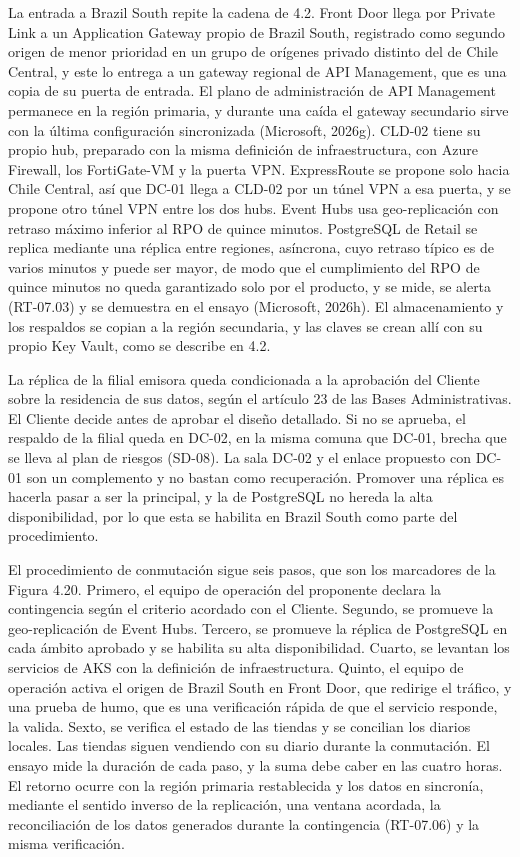 \documentclass[11pt]{article}
\begin{document}
La entrada a Brazil South repite la cadena de 4.2. Front Door llega por Private Link a un Application Gateway propio de Brazil South, registrado como segundo origen de menor prioridad en un grupo de orígenes privado distinto del de Chile Central, y este lo entrega a un gateway regional de API Management, que es una copia de su puerta de entrada. El plano de administración de API Management permanece en la región primaria, y durante una caída el gateway secundario sirve con la última configuración sincronizada (Microsoft, 2026g). CLD-02 tiene su propio hub, preparado con la misma definición de infraestructura, con Azure Firewall, los FortiGate-VM y la puerta VPN. ExpressRoute se propone solo hacia Chile Central, así que DC-01 llega a CLD-02 por un túnel VPN a esa puerta, y se propone otro túnel VPN entre los dos hubs. Event Hubs usa geo-replicación con retraso máximo inferior al RPO de quince minutos. PostgreSQL de Retail se replica mediante una réplica entre regiones, asíncrona, cuyo retraso típico es de varios minutos y puede ser mayor, de modo que el cumplimiento del RPO de quince minutos no queda garantizado solo por el producto, y se mide, se alerta (RT-07.03) y se demuestra en el ensayo (Microsoft, 2026h). El almacenamiento y los respaldos se copian a la región secundaria, y las claves se crean allí con su propio Key Vault, como se describe en 4.2.

La réplica de la filial emisora queda condicionada a la aprobación del Cliente sobre la residencia de sus datos, según el artículo 23 de las Bases Administrativas. El Cliente decide antes de aprobar el diseño detallado. Si no se aprueba, el respaldo de la filial queda en DC-02, en la misma comuna que DC-01, brecha que se lleva al plan de riesgos (SD-08). La sala DC-02 y el enlace propuesto con DC-01 son un complemento y no bastan como recuperación. Promover una réplica es hacerla pasar a ser la principal, y la de PostgreSQL no hereda la alta disponibilidad, por lo que esta se habilita en Brazil South como parte del procedimiento.

El procedimiento de conmutación sigue seis pasos, que son los marcadores de la Figura 4.20. Primero, el equipo de operación del proponente declara la contingencia según el criterio acordado con el Cliente. Segundo, se promueve la geo-replicación de Event Hubs. Tercero, se promueve la réplica de PostgreSQL en cada ámbito aprobado y se habilita su alta disponibilidad. Cuarto, se levantan los servicios de AKS con la definición de infraestructura. Quinto, el equipo de operación activa el origen de Brazil South en Front Door, que redirige el tráfico, y una prueba de humo, que es una verificación rápida de que el servicio responde, la valida. Sexto, se verifica el estado de las tiendas y se concilian los diarios locales. Las tiendas siguen vendiendo con su diario durante la conmutación. El ensayo mide la duración de cada paso, y la suma debe caber en las cuatro horas. El retorno ocurre con la región primaria restablecida y los datos en sincronía, mediante el sentido inverso de la replicación, una ventana acordada, la reconciliación de los datos generados durante la contingencia (RT-07.06) y la misma verificación.
\end{document}
